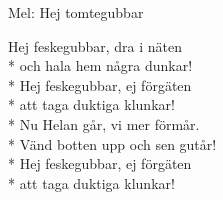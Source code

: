 \begin{SongText}
    \begin{SongInfo}
        Mel: Hej tomtegubbar
    \end{SongInfo}
    \begin{SongVerse}
        Hej feskegubbar, dra i näten\\*%
        och hala hem några dunkar!\\*%
        Hej feskegubbar, ej förgäten\\*%
        att taga duktiga klunkar!\\*%
        Nu Helan går, vi mer förmår.\\*%
        Vänd botten upp och sen gutår!\\*%
        Hej feskegubbar, ej förgäten\\*%
        att taga duktiga klunkar!
    \end{SongVerse}
\end{SongText}

